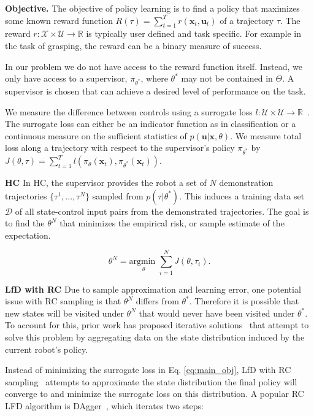 \documentclass[10pt, conference]{ieeeconf}      %
\newcommand{\bu}{\mathbf{u}}
\newcommand{\bx}{\mathbf{x}}
\newcommand{\nc}{RC }
\begin{document}
\noindent\textbf{Objective.} The objective of policy learning is to find a policy that maximizes some known reward function $R(\tau) = \sum^T_{t=1} r(\bx_t,\bu_t)$ of a trajectory $\tau$. The reward $r:\mathcal{X}\times \mathcal{U}\to \mathbb{R}$ is typically user defined and task specific. 
For example in the task of grasping, the reward can be a binary measure of success.

In our problem we do not have access to the reward function itself. Instead, we only have access to 
a supervisor, $\pi_{\theta^*}$, where $\theta^*$ may not be contained in $\Theta$. A supervisor is chosen that can achieve a desired level of performance on the task.

We measure the difference between controls using a surrogate loss $l : \mathcal{U} \times \mathcal{U} \rightarrow \mathbb{R}$~\cite{ross2010reduction,ross2010efficient}.
The surrogate loss can either be an indicator function as in classification or a continuous measure on the sufficient statistics of $p(\bu|\bx,\theta)$.
We measure total loss along a trajectory with respect to the supervisor's policy $\pi_{\theta^*}$ by $J(\theta, \tau) = \sum^T_{t=1} l(\pi_{\theta}(\bx_{t}),\pi_{\theta^*}(\bx_{t}))$.

\noindent \textbf{HC} In HC, the supervisor provides the robot a set of $N$ demonstration trajectories $\lbrace \tau^1,...,\tau^N \rbrace$ sampled from $p(\tau | \theta^*)$.
This induces a training data set $\mathcal{D}$ of all state-control input pairs from the demonstrated trajectories.
The goal is to find the $\theta^N$ that minimizes the empirical risk, or sample estimate of the expectation. 


\begin{equation}\label{eq:main_obj}
\theta^N = \underset{\theta}{\mbox{argmin }} \sum \limits_{i=1}^N J(\theta, \tau_i).
\end{equation}

\noindent \textbf{LfD with RC}
Due to sample approximation and learning error, one potential issue with \nc sampling is that $\theta^N$ differs from $\theta^*$.
Therefore it is possible that new states will be visited under $\theta^N$ that would never have been visited under $\theta^*$.
To account for this, prior work has proposed iterative solutions~\cite{ross2010reduction} that attempt to solve this problem by aggregating data on the state distribution induced by the current robot's policy.

Instead of  minimizing the surrogate loss in Eq. \ref{eq:main_obj},   LfD with RC sampling~\cite{ross2010reduction,laskeyshiv,he2012imitation} attempts to approximate the state distribution the final policy will converge to and minimize the surrogate loss on this distribution.
A popular RC LFD algorithm is DAgger~\cite{ross2010reduction}, which iterates two steps:
\end{document}

